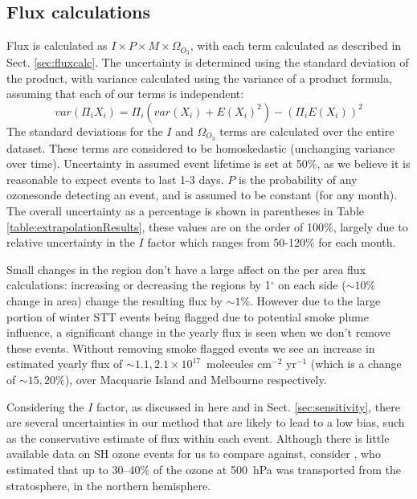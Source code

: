 \documentclass[acp, manuscript]{copernicus} %
\begin{document}
  \subsection{Flux calculations}
    \label{sec:fluxuncertainty}
    Flux is calculated as $ I \times P \times M \times \Omega_{O_3}$, with each term calculated as described in Sect. \ref{sec:fluxcalc}.
    The uncertainty is determined using the standard deviation of the product, with variance calculated using the variance of a product formula, assuming that each of our terms is independent: 
    \begin{equation*} var(\Pi_i X_i) = \Pi_i ( var(X_i) + E(X_i)^2 ) - (\Pi_i E(X_i))^2 \end{equation*}
    The standard deviations for the $I$ and $\Omega_{O_3}$ terms are calculated over the entire dataset.
    These terms are considered to be homoskedastic (unchanging variance over time).
    Uncertainty in assumed event lifetime is set at 50\%, as we believe it is reasonable to expect events to last 1-3 days.
    $P$ is the probability of any ozonesonde detecting an event, and is assumed to be constant (for any month).
    The overall uncertainty as a percentage is shown in parentheses in Table \ref{table:extrapolationResults}, these values are on the order of 100\%, largely due to relative uncertainty in the $I$ factor which ranges from 50-120\% for each month.
    
    Small changes in the region don't have a large affect on the per area flux calculations: increasing or decreasing the regions by 1$^{\circ}$ on each side ($\sim 10\%$ change in area) change the resulting flux by $\sim 1\%$. %
    However due to the large portion of winter STT events being flagged due to potential smoke plume influence, a significant change in the yearly flux is seen when we don't remove these events.
    Without removing smoke flagged events we see an increase in estimated yearly flux of $\sim 1.1, 2.1 \times 10^{17} $~molecules cm$^{-2}$ yr$^{-1}$ (which is a change of $\sim 15, 20\%$), over Macquarie Island and Melbourne respectively.
    
    Considering the $I$ factor, as discussed in here and in Sect. \ref{sec:sensitivity}, there are several uncertainties in our method that are likely to lead to a low bias, such as the conservative estimate of flux within each event.
    Although there is little available data on SH ozone events for us to compare against, consider \citet{Terao2008}, who estimated that up to 30--40\% of the ozone at 500~hPa was transported from the stratosphere, in the northern hemisphere.
    
\end{document}
